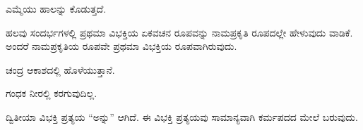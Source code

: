 \vspace{2.5pt plus 3pt minus 0.5pt}\noindent\hspace*{1.2em}\hspace{0.55em}ಎಮ್ಮೆಯು ಹಾಲನ್ನು ಕೊಡುತ್ತದೆ.\par

\begin{kbvrule}
\noindent\kbvbullet\hspace{0.5em}ಹಲವು ಸಂದರ್ಭಗಳಲ್ಲಿ ಪ್ರಥಮಾ ವಿಭಕ್ತಿಯ ಏಕವಚನ ರೂಪವನ್ನು ನಾಮಪ್ರಕೃತಿ ರೂಪದಲ್ಲೇ ಹೇಳುವುದು ವಾಡಿಕೆ. ಅಂದರೆ ನಾಮಪ್ರಕೃತಿಯ ರೂಪವೇ ಪ್ರಥಮಾ ವಿಭಕ್ತಿಯ ರೂಪವಾಗಿರುವುದು.
\end{kbvrule}

\vspace{3pt plus 2pt}\noindent\hspace*{1.2em}\par\vspace{1pt}

\vspace{2.5pt plus 3pt minus 0.5pt}\noindent\hspace*{1.2em}\hspace{0.55em}ಚಂದ್ರ ಆಕಾಶದಲ್ಲಿ ಹೊಳೆಯುತ್ತಾನೆ.\par

\vspace{2.5pt plus 3pt minus 0.5pt}\noindent\hspace*{1.2em}\hspace{0.55em}ಗಂಧಕ ನೀರಲ್ಲಿ ಕರಗುವುದಿಲ್ಲ.\par

\vspace{4pt plus 4pt minus 1pt}\hspace{0.5em}ದ್ವಿತೀಯಾ ವಿಭಕ್ತಿ ಪ್ರತ್ಯಯ “ಅನ್ನು” ಆಗಿದೆ. ಈ ವಿಭಕ್ತಿ ಪ್ರತ್ಯಯವು ಸಾಮಾನ್ಯವಾಗಿ ಕರ್ಮಪದದ ಮೇಲೆ ಬರುವುದು.\par
